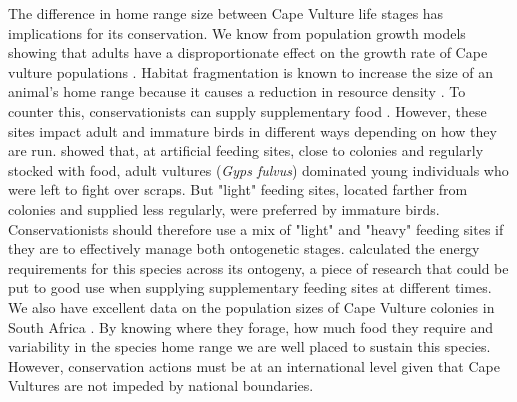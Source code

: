 	\indent The difference in home range size between Cape Vulture life stages has implications for its conservation. We know from population growth models showing that adults have a disproportionate effect on the growth rate of Cape vulture populations \citep{monadjem2014effect}. Habitat fragmentation is known to increase the size of an animal's home range because it causes a reduction in resource density \citep{haskell2002fractal}. To counter this, conservationists can supply supplementary food \citep{piper2005supplementary}. However, these sites impact adult and immature birds in different ways depending on how they are run.  \cite{duriez2012intra} showed that, at artificial feeding sites, close to colonies and regularly stocked with food, adult vultures (\textit{Gyps fulvus}) dominated young individuals who were left to fight over scraps. But "light" feeding sites, located farther from colonies and supplied less regularly, were preferred by immature birds. Conservationists should therefore use a mix of "light" and "heavy" feeding sites if they are to effectively manage both ontogenetic stages. \cite{komen1991energy} calculated the energy requirements for this species across its ontogeny, a piece of research that could be put to good use when supplying supplementary feeding sites at different times. We also have excellent data on the population sizes of Cape Vulture colonies in South Africa \citep{whittington2011monitoring}. By knowing where they forage, how much food they require and variability in the species home range we are well placed to sustain this species. However, conservation actions must be at an international level \citep{lambertucci2014apex} given that Cape Vultures are not impeded by national boundaries. 


%
